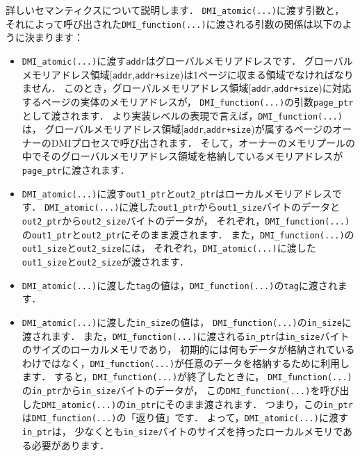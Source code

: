 \documentclass[report,12pt]{jsbook}
\begin{document}
詳しいセマンティクスについて説明します．
\texttt{DMI\_atomic(...)}に渡す引数と，
それによって呼び出された\texttt{DMI\_function(...)}に渡される引数の関係は以下のように決まります：
\begin{itemize}
\item \texttt{DMI\_atomic(...)}に渡す\texttt{addr}はグローバルメモリアドレスです．
  グローバルメモリアドレス領域[\texttt{addr},\texttt{addr+size})は1ページに収まる領域でなければなりません．
  このとき，グローバルメモリアドレス領域[\texttt{addr},\texttt{addr+size})に対応するページの実体のメモリアドレスが，
  \texttt{DMI\_function(...)}の引数\texttt{page\_ptr}として渡されます．
  より実装レベルの表現で言えば，\texttt{DMI\_function(...)}は，
  グローバルメモリアドレス領域[\texttt{addr},\texttt{addr+size})が属するページのオーナーのDMIプロセスで呼び出されます．
  そして，オーナーのメモリプールの中でそのグローバルメモリアドレス領域を格納しているメモリアドレスが\texttt{page\_ptr}に渡されます．
\item \texttt{DMI\_atomic(...)}に渡す\texttt{out1\_ptr}と\texttt{out2\_ptr}はローカルメモリアドレスです．
  \texttt{DMI\_atomic(...)}に渡した\texttt{out1\_ptr}から\texttt{out1\_size}バイトのデータと
  \texttt{out2\_ptr}から\texttt{out2\_size}バイトのデータが，
  それぞれ，\texttt{DMI\_function(...)}の\texttt{out1\_ptr}と\texttt{out2\_ptr}にそのまま渡されます．
  また，\texttt{DMI\_function(...)}の\texttt{out1\_size}と\texttt{out2\_size}には，
  それぞれ，\texttt{DMI\_atomic(...)}に渡した\texttt{out1\_size}と\texttt{out2\_size}が渡されます．
\item \texttt{DMI\_atomic(...)}に渡した\texttt{tag}の値は，\texttt{DMI\_function(...)}の\texttt{tag}に渡されます．
\item \texttt{DMI\_atomic(...)}に渡した\texttt{in\_size}の値は，
  \texttt{DMI\_function(...)}の\texttt{in\_size}に渡されます．
  また，\texttt{DMI\_function(...)}に渡される\texttt{in\_ptr}は\texttt{in\_size}バイトのサイズのローカルメモリであり，
  初期的には何もデータが格納されているわけではなく，\texttt{DMI\_function(...)}が任意のデータを格納するために利用します．
  すると，\texttt{DMI\_function(...)}が終了したときに，
  \texttt{DMI\_function(...)}の\texttt{in\_ptr}から\texttt{in\_size}バイトのデータが，
  この\texttt{DMI\_function(...)}を呼び出した\texttt{DMI\_atomic(...)}の\texttt{in\_ptr}にそのまま渡されます．
  つまり，この\texttt{in\_ptr}は\texttt{DMI\_function(...)}の「返り値」です．
  よって，\texttt{DMI\_atomic(...)}に渡す\texttt{in\_ptr}は，
  少なくとも\texttt{in\_size}バイトのサイズを持ったローカルメモリである必要があります．
\end{itemize}
\end{document}
